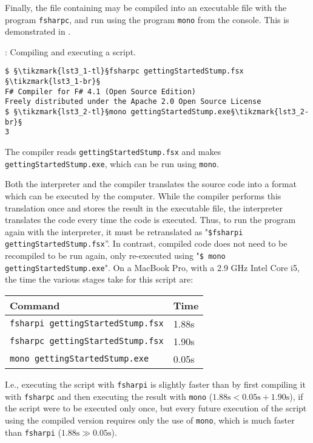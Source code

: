 \documentclass[springer.tex]{subfiles}
\begin{document}
Finally, the file containing  may be compiled into an executable file with the program \lstinline[language=console]{fsharpc}, and run using the program \lstinline[language=console]{mono} from the console. This is demonstrated in .
%
\begin{codeNOutput}[label=compiler,
  top=-5pt,
  bottom=-5pt,
  left=-2pt,
  right=-2pt,
]{: Compiling and executing a script.}
\begin{lstlisting}[language=console,escapechar=§]
$ §\tikzmark{lst3_1-tl}§fsharpc gettingStartedStump.fsx §\tikzmark{lst3_1-br}§
F# Compiler for F# 4.1 (Open Source Edition)
Freely distributed under the Apache 2.0 Open Source License
$ §\tikzmark{lst3_2-tl}§mono gettingStartedStump.exe§\tikzmark{lst3_2-br}§
3
\end{lstlisting}
\end{codeNOutput}
%
%
%
The compiler reads \lstinline[language=console]{gettingStartedStump.fsx} and makes \lstinline[language=console]{gettingStartedStump.exe}, which can be run using \lstinline[language=console]{mono}.

Both the interpreter and the compiler translates the source code into a format which can be executed by the computer. While the compiler performs this translation once and stores the result in the executable file, the interpreter translates the code every time the code is executed. Thus, to run the program again with the interpreter, it must be retranslated as "\lstinline[language=console]{$fsharpi gettingStartedStump.fsx}''. %
In contrast, compiled code does not need to be recompiled to be run again, only re-executed using "\lstinline[language=console]{$ mono gettingStartedStump.exe}". %
On a MacBook Pro, with a 2.9 GHz Intel Core i5, the time the various stages take for this script are:
\begin{center}
  \begin{tabular}{|l|l|}
    \hline
    \rowcolor{headerRowColor} Command & Time\\
    \hline
    \lstinline[language=console]|fsharpi gettingStartedStump.fsx| & 1.88s\\
    \lstinline[language=console]|fsharpc gettingStartedStump.fsx| & 1.90s\\
    \lstinline[language=console]|mono gettingStartedStump.exe| & 0.05s\\
    \hline
\end{tabular}
\end{center}
I.e., executing the script with \lstinline[language=console]|fsharpi| is slightly faster than by first compiling it with \lstinline[language=console]|fsharpc| and then executing the result with \lstinline[language=console]|mono| ($1.88\text{s} < 0.05\text{s}+1.90\text{s}$), if the script were to be executed only once, but every future execution of the script using the compiled version requires only the use of \lstinline[language=console]|mono|, which is much faster than \lstinline[language=console]|fsharpi| ($1.88\text{s}\gg 0.05\text{s}$).
\end{document}
